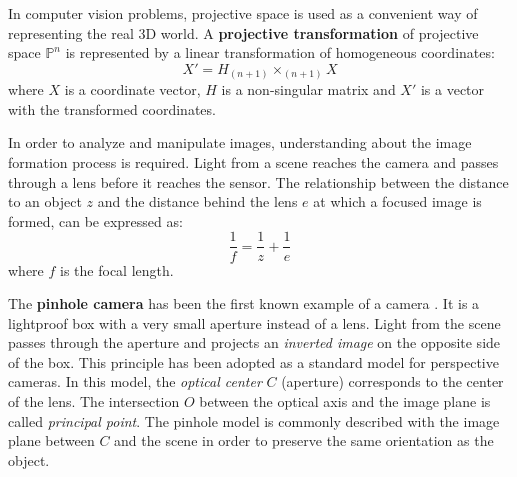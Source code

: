 In computer vision problems, projective space is used as a convenient way of representing the real 3D world.
A \textbf{projective transformation} of projective space $\mathds{P}^n$ is represented by a linear transformation of homogeneous coordinates:
\begin{equation}
X' = H_{(n+1)} \times _{(n+1)}X
\end{equation}
where $X$ is a coordinate vector, $H$ is a non-singular matrix and $X'$ is a vector with the transformed coordinates.

In order to analyze and manipulate images, understanding about the image formation process is required.
Light from a scene reaches the camera and passes through a lens before it reaches the sensor.
The relationship between the distance to an object $z$ and the distance behind the lens $e$ at which a focused image is formed, can be expressed as:
\begin{equation}
\label{eq:optics}
\frac{1}{f} = \frac{1}{z} + \frac{1}{e}
\end{equation}
where $f$ is the focal length.

The \textbf{pinhole camera} has been the first known example of a camera \cite{gernsheim1969history}.
It is a lightproof box with a very small aperture instead of a lens.
Light from the scene passes through the aperture and projects an \textit{inverted image} on the opposite side of the box.
This principle has been adopted as a standard model for perspective cameras.
In this model, the \textit{optical center} $C$ (aperture) corresponds to the center of the lens.
The intersection $O$ between the optical axis and the image plane is called \textit{principal point}.
The pinhole model is commonly described with the image plane between $C$ and the scene in order to preserve the same orientation as the object.

